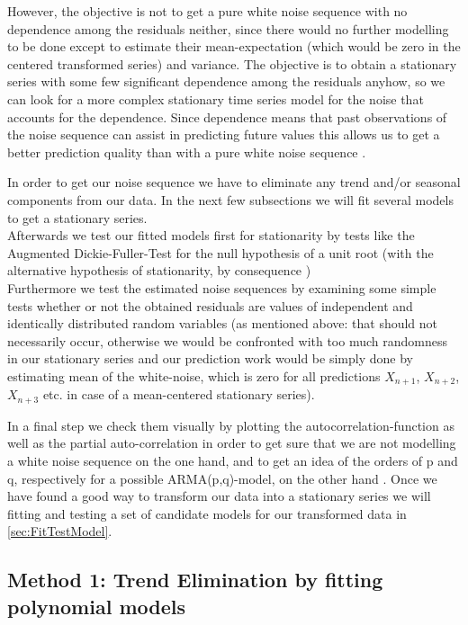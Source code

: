 \documentclass[11pt,a4paper]{article}
\begin{document}
However, the objective is not to get a pure white noise sequence  with no dependence among the residuals neither, since there would no further modelling to be done except to estimate their mean-expectation (which would be zero in the centered transformed series) and variance.
The objective is to obtain a stationary series with some few significant dependence among the residuals anyhow, so we can look for a more complex stationary time series model for the noise that accounts for the dependence.
Since dependence means that past observations of the noise sequence can assist in predicting future values this allows us to get a better prediction quality than with a pure white noise sequence \cite[p.~35]{bd02}.

In order to get our noise sequence we have to eliminate any trend and/or seasonal components from our data.
In the next few subsections we will fit several models to get a stationary series.\\
Afterwards we test our fitted models first for stationarity by tests like the Augmented Dickie-Fuller-Test for the null hypothesis of a unit root (with the alternative hypothesis of stationarity, by consequence \citep{adf}) \\

Furthermore we test the estimated noise sequences by examining some simple tests whether or not the obtained residuals are values of independent and identically distributed random variables (as mentioned above: that should not necessarily occur, otherwise we would be confronted with too much randomness in our stationary series and our prediction work would be simply done by estimating mean of the white-noise, which is zero for all predictions $X_{n+1}$, $X_{n+2}$, $X_{n+3}$ etc. in case of a mean-centered stationary series).

In a final step we check them visually by plotting the autocorrelation-function as well as the partial auto-correlation in order to get sure that we are not modelling a white noise sequence on the one hand, and to get an idea of the orders of p and q, respectively for a possible ARMA(p,q)-model, on the other hand \cite[pp.~83--110]{bd02}.
Once we have found a good way to transform our data into a stationary series we will fitting and testing a set of candidate models for our transformed data in \cref{sec:FitTestModel}.



\subsection{Method 1: Trend Elimination by fitting polynomial models}
\end{document}
